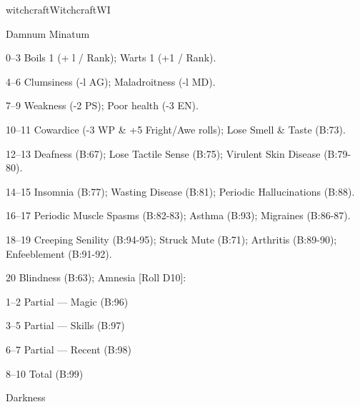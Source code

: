 \begin{College}[1.1]{witchcraft}{Witchcraft}{WI}
\begin{spell}[G-1]{Damnum Minatum}
\begin{effects}
\begin{Description}
  \item[0–3] Boils 1 (+ l / Rank); Warts 1 (+1 / Rank). 
  \item[4–6] Clumsiness (-l AG); Maladroitness (-l MD). 
  \item[7–9] Weakness (-2 PS); Poor health (-3 EN). 
  \item[10–11] Cowardice (-3 WP \& +5 Fright/Awe rolls); 
    Lose Smell \& Taste (B:73). 
  \item[12–13] Deafness (B:67); Lose Tactile Sense (B:75); 
    Virulent Skin Disease (B:79-80). 
  \item[14–15] Insomnia (B:77); Wasting Disease (B:81); 
    Periodic Hallucinations (B:88). 
  \item[16–17] Periodic Muscle Spasms (B:82-83); Asthma 
    (B:93); Migraines (B:86-87). 
  \item[18–19] Creeping Senility (B:94-95); Struck Mute 
    (B:71); Arthritis (B:89-90); Enfeeblement (B:91-92). 
  \item[20] Blindness (B:63); 
    Amnesia [Roll D10]:
    \begin{Description}
    \item[1–2] Partial — Magic (B:96) 
    \item[3–5] Partial — Skills (B:97) 
    \item[6–7] Partial — Recent (B:98) 
    \item[8–10] Total (B:99) 
    \end{Description}
\end{Description}
\end{effects}
\end{spell}

\begin{spell}[G-2]{Darkness}


\end{spell}
\end{College}
